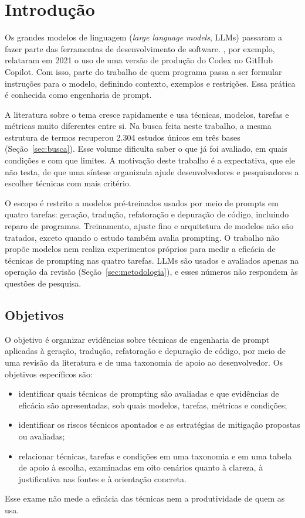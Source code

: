 \section{Introdução}
Os grandes modelos de linguagem (\textit{large language models}, LLMs) passaram a fazer
parte das ferramentas de desenvolvimento de software. , por
exemplo, relataram em 2021 o uso de uma versão de produção do Codex no GitHub Copilot. Com isso,
parte do trabalho de quem programa passa a ser formular instruções para o modelo, definindo
contexto, exemplos e restrições. Essa prática é conhecida como engenharia de prompt.

A literatura sobre o tema cresce rapidamente e usa técnicas, modelos, tarefas e métricas muito
diferentes entre si. Na busca feita neste trabalho, a mesma estrutura de termos recuperou 2.304
estudos únicos em três bases (Seção~\ref{sec:busca}). Esse volume dificulta saber o que já foi
avaliado, em quais condições e com que limites. A motivação deste trabalho é a expectativa, que ele
não testa, de que uma síntese organizada ajude desenvolvedores e pesquisadores a escolher técnicas
com mais critério.

O escopo é restrito a modelos pré-treinados usados por meio de prompts em quatro tarefas: geração,
tradução, refatoração e depuração de código, incluindo reparo de programas. Treinamento, ajuste
fino e arquitetura de modelos não são tratados, exceto quando o estudo também avalia prompting.
O trabalho não propõe modelos nem realiza experimentos próprios para medir a eficácia de técnicas de
prompting nas quatro tarefas. LLMs são usados e avaliados apenas na operação da revisão
(Seção~\ref{sec:metodologia}), e esses números não respondem às questões de pesquisa.

\subsection{Objetivos}
O objetivo é organizar evidências sobre técnicas de engenharia de prompt aplicadas à geração,
tradução, refatoração e depuração de código, por meio de uma revisão da literatura e de uma
taxonomia de apoio ao desenvolvedor. Os objetivos específicos são:
\begin{itemize}
  \item identificar quais técnicas de prompting são avaliadas e que evidências de eficácia são
  apresentadas, sob quais modelos, tarefas, métricas e condições;
  \item identificar os riscos técnicos apontados e as estratégias de mitigação propostas ou avaliadas;
  \item relacionar técnicas, tarefas e condições em uma taxonomia e em uma tabela de apoio à escolha,
  examinadas em oito cenários quanto à clareza, à justificativa nas fontes e à orientação concreta.
\end{itemize}
Esse exame não mede a eficácia das técnicas nem a produtividade de quem as usa.

